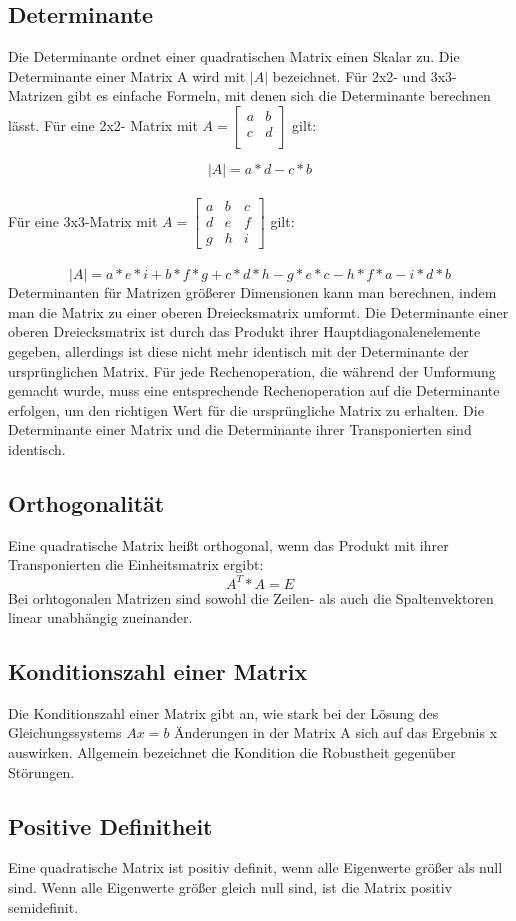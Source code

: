 \documentclass[11pt]{scrreprt}
\begin{document}
\subsection{Determinante}
Die Determinante ordnet einer quadratischen Matrix einen Skalar zu. Die Determinante einer Matrix A wird mit $|A|$ bezeichnet.
Für 2x2- und 3x3- Matrizen gibt es einfache Formeln, mit denen sich die Determinante berechnen lässt. Für eine 2x2- Matrix mit $
A =
\begin{bmatrix}
a & b \\
c & d \\
\end{bmatrix}
$ gilt:

\begin{equation}
|A| = a*d - c*b
\end {equation}
\\
Für eine 3x3-Matrix mit $
A = 
\begin{bmatrix}
a & b & c \\
d & e & f \\
g & h & i
\end{bmatrix}
$  gilt:
\\
\\
\begin {equation}
|A| = a*e*i + b*f*g + c*d*h - g*e*c - h*f*a - i*d*b
\end {equation}
Determinanten für Matrizen größerer Dimensionen kann man berechnen, indem man die Matrix zu einer oberen Dreiecksmatrix umformt. Die Determinante einer oberen Dreiecksmatrix ist durch das Produkt ihrer Hauptdiagonalenelemente gegeben, allerdings ist diese nicht mehr identisch mit der Determinante der ursprünglichen Matrix. Für jede Rechenoperation, die während der Umformung gemacht wurde, muss eine entsprechende Rechenoperation auf die Determinante erfolgen, um den richtigen Wert für die ursprüngliche Matrix zu erhalten.
Die Determinante einer Matrix und die Determinante ihrer Transponierten sind identisch.
\subsection{Orthogonalität}
Eine quadratische Matrix heißt orthogonal, wenn das Produkt mit ihrer Transponierten die Einheitsmatrix ergibt:
\begin{equation}
A^T * A = E
\end{equation}
Bei orhtogonalen Matrizen sind sowohl die Zeilen- als  auch die Spaltenvektoren linear unabhängig zueinander.
\subsection{Konditionszahl einer Matrix}
Die Konditionszahl einer Matrix gibt an, wie stark bei der Lösung des Gleichungssystems $Ax=b$ Änderungen in der Matrix A sich auf das Ergebnis x auswirken. Allgemein bezeichnet die Kondition die Robustheit gegenüber Störungen.
\subsection{Positive Definitheit}
Eine quadratische Matrix ist positiv definit, wenn alle Eigenwerte größer als null sind. Wenn alle Eigenwerte größer gleich null sind, ist die Matrix positiv semidefinit.
\end{document}
